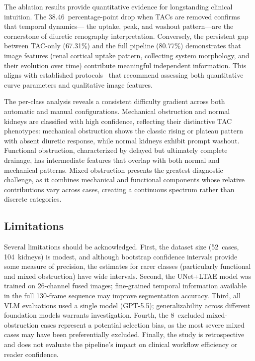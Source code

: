 \documentclass[sn-basic]{sn-jnl}
\begin{document}
The ablation results provide quantitative evidence for
longstanding clinical intuition.  The 38.46~percentage-point
drop when TACs are removed confirms that temporal dynamics---
the uptake, peak, and washout pattern---are the cornerstone
of diuretic renography interpretation.  Conversely, the
persistent gap between TAC-only (67.31\%) and the full
pipeline (80.77\%) demonstrates that image features (renal
cortical uptake pattern, collecting system morphology, and
their evolution over time) contribute meaningful independent
information.  This aligns with established
protocols~\cite{official} that recommend assessing both
quantitative curve parameters and qualitative image features.

The per-class analysis reveals a consistent difficulty
gradient across both automatic and manual configurations.
Mechanical obstruction and normal kidneys are classified
with high confidence, reflecting their distinctive TAC
phenotypes: mechanical obstruction shows the classic rising
or plateau pattern with absent diuretic response, while
normal kidneys exhibit prompt washout.  Functional
obstruction, characterized by delayed but ultimately
complete drainage, has intermediate features that overlap
with both normal and mechanical patterns.  Mixed obstruction
presents the greatest diagnostic challenge, as it combines
mechanical and functional components whose relative
contributions vary across cases, creating a continuous
spectrum rather than discrete categories.

\subsection{Limitations}

Several limitations should be acknowledged.  First, the
dataset size (52~cases, 104~kidneys) is modest, and although
bootstrap confidence intervals provide some measure of
precision, the estimates for rarer classes (particularly
functional and mixed obstruction) have wide intervals.
Second, the UNet+LTAE model was trained on 26-channel fused
images; fine-grained temporal information available in the
full 130-frame sequence may improve segmentation accuracy.
Third, all VLM evaluations used a single model (GPT-5.5);
generalizability across different foundation models warrants
investigation.  Fourth, the 8~excluded mixed-obstruction
cases represent a potential selection bias, as the most
severe mixed cases may have been preferentially excluded.
Finally, the study is retrospective and does not evaluate
the pipeline's impact on clinical workflow efficiency or
reader confidence.
\end{document}
